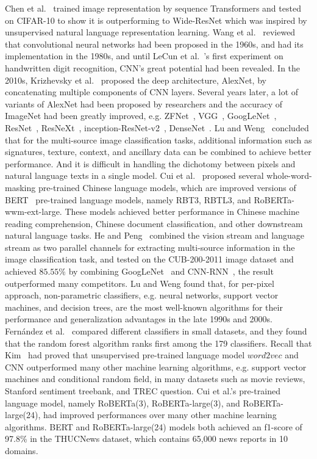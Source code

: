 \documentclass[runningheads]{llncs}
\begin{document}
  Chen et al.~\cite{chen2020generative} trained image representation by sequence Transformers and tested on CIFAR-10 to show it is outperforming to Wide-ResNet
which was inspired by unsupervised natural language representation learning.
  Wang et al.~\cite{wang2019development} reviewed that convolutional neural networks had been proposed in the 1960s, and had its implementation in the 1980s,
and until LeCun et al.~\cite{lecun1990handwritten}'s first experiment on handwritten digit recognition, CNN's great potential had been revealed.
  In the 2010s, Krizhevsky et al.~\cite{krizhevsky2012imagenet} proposed the deep architecture, AlexNet, by concatenating multiple components of CNN layers.
Several years later, a lot of variants of AlexNet had been proposed by researchers and the accuracy of ImageNet had been greatly improved, e.g. ZFNet~\cite{zeiler2014visualizing}, VGG~\cite{simonyan2014very}, GoogLeNet~\cite{szegedy2015going}, ResNet~\cite{he2016deep},
 ResNeXt~\cite{xie2017aggregated}, inception-ResNet-v2~\cite{szegedy2016inception}, DenseNet~\cite{huang2016deep}.
  Lu and Weng~\cite{lu2007survey} concluded that for the multi-source image classification tasks, additional information such as signatures, texture, context, and ancillary data can be combined to achieve better performance.
And it is difficult in handling the dichotomy between pixels and natural language texts in a single model.
  Cui et al.~\cite{cui2020revisiting} proposed several whole-word-masking pre-trained Chinese language models,
which are improved versions of BERT~\cite{devlin2019bert} pre-trained language models, namely RBT3, RBTL3, and RoBERTa-wwm-ext-large.
These models achieved better performance in Chinese machine reading comprehension, Chinese document classification, and other downstream natural language tasks.
  He and Peng~\cite{he2017fine} combined the vision stream and language stream as two parallel channels for extracting multi-source information in the image classification task,
and tested on the CUB-200-2011 image dataset and achieved $85.55\%$ by combining GoogLeNet~\cite{szegedy2015going} and CNN-RNN~\cite{reed2016learning}, the result outperformed many competitors.
  Lu and Weng found that, for per-pixel approach, non-parametric classifiers, e.g. neural networks, support vector machines, and decision trees,
are the most well-known algorithms for their performance and generalization advantages in the late 1990s and 2000s.
Fern{\'a}ndez et al.~\cite{fernandez2014we} compared different classifiers in small datasets, and they found that the random forest algorithm ranks first among the 179 classifiers.
  Recall that Kim~\cite{kim2014convolutional} had proved that unsupervised pre-trained language model $word2vec$ and CNN outperformed many other machine learning algorithms,
e.g. support vector machines and conditional random field, in many datasets such as movie reviews, Stanford sentiment treebank, and TREC question.
Cui et al.'s pre-trained language model, namely RoBERTa(3), RoBERTa-large(3), and RoBERTa-large(24), had improved performances over many other machine learning algorithms.
BERT and RoBERTa-large(24) models both achieved an f1-score of 97.8\% in the THUCNews dataset, which contains 65,000 news reports in 10 domains.
\end{document}
